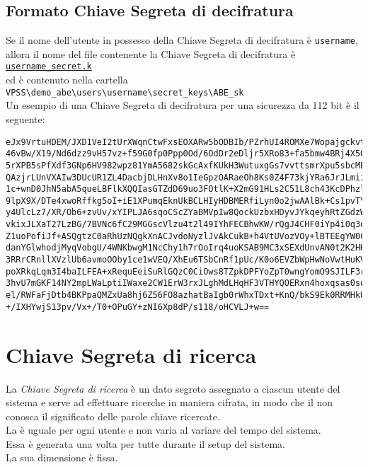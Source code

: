 \documentclass[a4paper,twoside,10pt,openany]{scrbook}
\begin{document}
\subsection{Formato Chiave Segreta di decifratura}\label{sec:format_sk}
%
Se il nome dell'utente in possesso della Chiave Segreta di decifratura è \texttt{username}, 
allora il nome del file contenente la Chiave Segreta di decifratura è \\
\texttt{\hyperref[sec:format_sk]{username\_secret.k}}\\
ed è contenuto nella cartella\\
\texttt{VPSS\textbackslash demo\_abe\textbackslash users\textbackslash username\textbackslash secret\_keys\textbackslash ABE\_sk}\\
Un esempio di una Chiave Segreta di decifratura per una sicurezza da 112 bit è il seguente:
\begin{verbatim}
eJx9VrtuHDEM/JXD1VeI2tUrXWqnCtwFxsEOXARw5bODBIb/PZrhUI4ROMXe7WopajgckvtyvDr/On
46vBw/X19/Nd6dzz9vH57vz+f59G0fp0Ppp0Od/6OdDr2eDljr5XRo83+fa5bmw4BRj4X50xJubG7f
5rXPB5sPfXdf3GNp6HV982wpz81YmA5682skGcAxfKUkH3WutuxgGs7vvttsmrXpu5sbcMEsC0gx3V
QAzjrLUnVXAIw3DUcUR1ZL4DacbjDLHnXv8o1IeGpzOARaeOh8Ks0Z4F73kjYRa6JrJLmii+pvcTk5
1c+wnD0JhN5abA5queLBFlkXQQIasGTZdD69uo3FOtlK+X2mG91HLs2C51L8ch43KcDPhzl84NhmsT
9lpX9X/DTe4xwoRffkg5oI+iE1XPumqEknUkBCLHIyHDBMERfiLyn0o2jwAAlBk+Cs1pvTYZbA94fb
y4UlcLz7/XR/Ob6+zvUv/xYIPLJA6sqoCScZYaBMVpIw8QockUzbxHDyvJYkqeyhRtZGdzWGumoQTy
vkixJLXaT27LzBG/7BVNc6fC29MGGscVlzu4t2l49IYhFECBhwKW/rQgJ4CHF0iYp4i0q3qYq61zvl
Z1uoPofiJf+ASQgtzC0aRhUzNQgkXnACJvdoNyzlJvAkCukB+h4VtUVozVOy+lBTEEgYW0CP/jAEcV
danYGlwhodjMyqVobgU/4WNKbwgM1NcChy1h7rOoIrq4uoKSAB9MC3xSEXdUnvAN0t2K2HHx67eBW5
3RRrCRnllXVzlUb6avmoOOby1ce1wVEQ/XhEu6TSbCnRf1pUc/K0o6EVZbWpHwNoVwtHuKVJ+1jsJV
poXRkqLqm3I4baILFEA+xRequEeiSuRlGQzC0CiOws8TZpkDPFYoZpT0wngYomO9SJILF3rWmNt5iZ
3hvU7mGKF14NY2mpLWaLptiIWaxe2CW1ErW3rxJLghMdLHqHF3VTHYQOERxn4hoxqsas0soxdqu0CO
el/RWFaFjDtb4BKPpaQMZxUa8hj6Z56FO8azhatBaIgb0rWhxTDxt+KnQ/bkS9Ek0RRMHkUAgxxPjt
+/IXHYwjS13pv/Vx+/T0+OPuGY+zNI6Xp8dP/s118/oHCVLJ+w==
\end{verbatim}
%
\section{Chiave Segreta di ricerca}\label{sec:searchk}
La \emph{Chiave Segreta di ricerca} è un dato segreto assegnato a ciascun utente del sistema e serve ad effettuare ricerche in maniera cifrata, in modo che il \sr non conosca il significato delle parole chiave ricercate. \\
La \searchsk è uguale per ogni utente e non varia al variare del tempo del sistema. \\
Essa è generata una volta per tutte durante il setup del sistema.\\
La sua dimensione è fissa.
%
\end{document}
